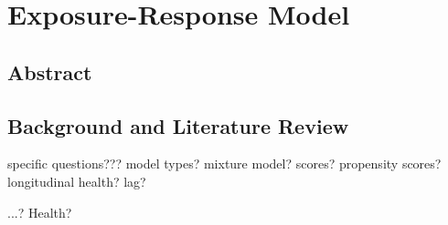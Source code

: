 \chapter{Exposure-Response Model}
\section{Abstract}

\section{Background and Literature Review}

specific questions???
model types?
mixture model?
scores? propensity scores?
longitudinal health?
lag?

...? Health?\\


